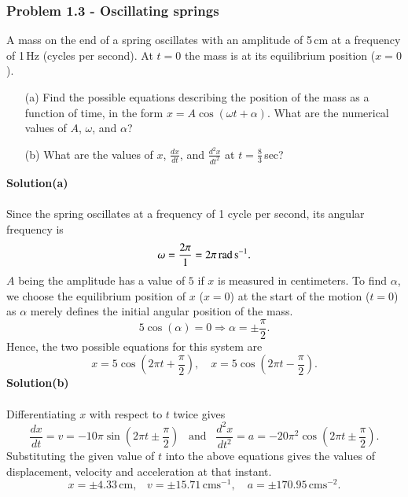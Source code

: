 \documentclass[12pt,a4paper]{article}
\begin{document}
\subsubsection*{Problem 1.3 - Oscillating springs}
A mass on the end of a spring oscillates with an amplitude of 5\,cm at a frequency of 1\,Hz (cycles per second). At $t=0$ the mass is at its equilibrium position ($x=0$).
\begin{enumerate}
    \item[(a)]Find the possible equations describing the position of the mass as a function of time, in the form $x=A\cos(\omega t+\alpha)$. What are the numerical values of $A$, $\omega$, and $\alpha$? 
    \item[(b)]What are the values of $x$, $\frac{dx}{dt}$, and $\frac{d^2x}{dt^2}$ at $t=\frac{8}{3}$\,sec? 
\end{enumerate}
\textbf{Solution(a)}
\\
\\Since the spring oscillates at a frequency of 1 cycle per second, its angular frequency is 
\[\omega=\frac{2\pi}{1}=2\pi\,\text{rad\,s}^{-1}.\]
$A$ being the amplitude has a value of $5$ if $x$ is measured in centimeters. To find $\alpha$, we choose the equilibrium position of $x$ ($x=0$) at the start of the motion ($t=0$) as $\alpha$ merely defines the initial angular position of the mass.
\[5\cos(\alpha)=0\Rightarrow\alpha=\pm\frac{\pi}{2}.\]
Hence, the two possible equations for this system are
\[x=5\cos\left(2\pi t+\frac{\pi}{2}\right),\,\,\,\,\,\,x=5\cos\left(2\pi t-\frac{\pi}{2}\right).\]
\textbf{Solution(b)}
\\
\\Differentiating $x$ with respect to $t$ twice gives
\[\frac{dx}{dt}=v=-10\pi\sin\left(2\pi t\pm\frac{\pi}{2}\right)\,\,\,\,\,\text{and}\,\,\,\,\,\frac{d^2x}{dt^2}=a=-20\pi^2\cos\left(2\pi t\pm\frac{\pi}{2}\right).\]
Substituting the given value of $t$ into the above equations gives the values of displacement, velocity and acceleration at that instant.
\[x=\pm4.33\,\text{cm},\,\,\,\,\,v=\pm15.71\,\text{cms}^{-1},\,\,\,\,\,\,a=\pm170.95\,\text{cms}^{-2}.\]
\end{document}
